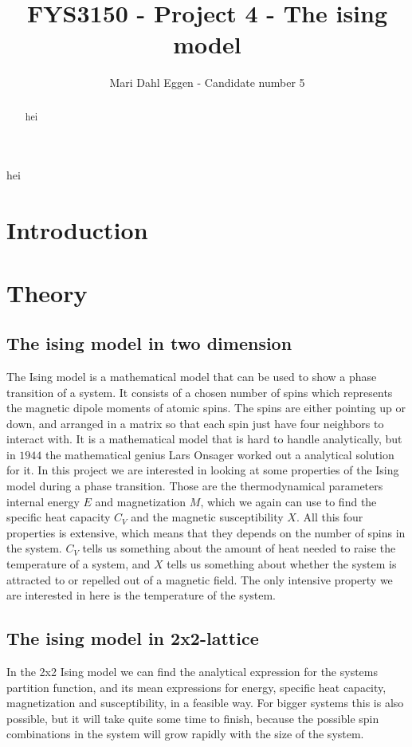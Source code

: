 \documentclass[12pt]{article}
\begin{document}
\title{FYS3150 - Project 4 - The ising model}
\author{Mari Dahl Eggen - Candidate number 5}
\maketitle

\newpage

\tableofcontents

\begin{flushleft}
\newpage
\begin{abstract}
hei
\end{abstract}
hei
\section{Introduction}
\newpage
\section{Theory}
\subsection{The ising model in two dimension}
The Ising model is a mathematical model that can be used to show a phase transition of a system. It consists of a chosen number of spins which represents the magnetic dipole moments of atomic spins. The spins are either pointing up or down, and arranged in a matrix so that each spin just have four neighbors to interact with. It is a mathematical model that is hard to handle analytically, but in $1944$ the mathematical genius Lars Onsager worked out a analytical solution for it. In this project we are interested in looking at some properties of the Ising model during a phase transition. Those are the thermodynamical parameters internal energy $E$ and magnetization $M$, which we again can use to find the specific heat capacity $C_V$ and the magnetic susceptibility $X$. All this four properties is extensive, which means that they depends on the number of spins in the system.  $C_V$ tells us something about the amount of heat needed to raise the temperature of a system, and $X$ tells us something about whether the system is attracted to or repelled out of a magnetic field. The only intensive property we are interested in here is the temperature of the system.  

\subsection{The ising model in 2x2-lattice}
In the 2x2 Ising model  we can find the analytical expression for the systems partition function, and its mean expressions for energy, specific heat capacity, magnetization and susceptibility, in a feasible way. For bigger systems this is also possible, but it will take quite some time to finish, because the possible spin combinations in the system will grow rapidly with the size of the system.  

\end{flushleft}
\end{document}
